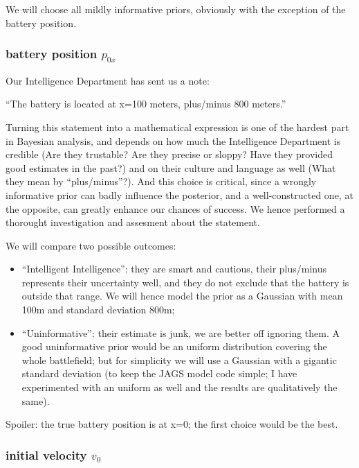 \documentclass[]{article}
\providecommand{\tightlist}{%
  \setlength{\itemsep}{0pt}\setlength{\parskip}{0pt}}
\begin{document}
We will choose all mildly informative priors, obviously with the
exception of the battery position.

\hypertarget{battery-position-p_0x}{%
\subsubsection{\texorpdfstring{battery position
\(p_{0x}\)}{battery position p\_\{0x\}}}\label{battery-position-p_0x}}

Our Intelligence Department has sent us a note:

``The battery is located at x=100 meters, plus/minus 800 meters.''

Turning this statement into a mathematical expression is one of the
hardest part in Bayesian analysis, and depends on how much the
Intelligence Department is credible (Are they trustable? Are they
precise or sloppy? Have they provided good estimates in the past?) and
on their culture and language as well (What they mean by
``plus/minus''?). And this choice is critical, since a wrongly
informative prior can badly influence the posterior, and a
well-constructed one, at the opposite, can greatly enhance our chances
of success. We hence performed a thorought investigation and assesment
about the statement.

We will compare two possible outcomes:

\begin{itemize}
\tightlist
\item
  ``Intelligent Intelligence'': they are smart and cautious, their
  plus/minus represents their uncertainty well, and they do not exclude
  that the battery is outside that range. We will hence model the prior
  as a Gaussian with mean 100m and standard deviation 800m;
\item
  ``Uninformative'': their estimate is junk, we are better off ignoring
  them. A good uninformative prior would be an uniform distribution
  covering the whole battlefield; but for simplicity we will use a
  Gaussian with a gigantic standard deviation (to keep the JAGS model
  code simple; I have experimented with an uniform as well and the
  results are qualitatively the same).
\end{itemize}

Spoiler: the true battery position is at x=0; the first choice would be
the best.

\hypertarget{initial-velocity-v_0}{%
\subsubsection{\texorpdfstring{initial velocity
\(v_0\)}{initial velocity v\_0}}\label{initial-velocity-v_0}}
\end{document}

